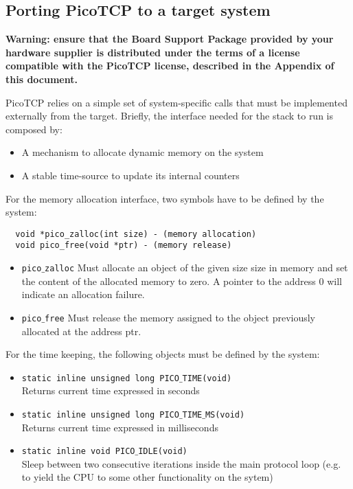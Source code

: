 \subsection{Porting PicoTCP to a target system}

\begin{center}
\textbf{Warning: ensure that the Board Support Package provided by your
hardware supplier is distributed under the terms of a license compatible
with the PicoTCP license, described in the Appendix of this document.}
\end{center}

PicoTCP relies on a simple set of system-specific calls that must be
implemented externally from the target. Briefly, the interface needed for
the stack to run is composed by:
\begin{itemize}
\item A mechanism to allocate dynamic memory on the system
\item A stable time-source to update its internal counters
\end{itemize} 

For the memory allocation interface, two symbols have to be defined by the system:
\begin{verbatim}
  void *pico_zalloc(int size) - (memory allocation) 
  void pico_free(void *ptr) - (memory release)
\end{verbatim}

\begin{itemize}
\item \texttt{pico$\_$zalloc} Must allocate an object of the given size size in memory
and set the content of the allocated memory to zero. A pointer to the address 0 will
indicate an allocation failure.
\item \texttt{pico$\_$free} Must release the memory assigned to the object previously
allocated at the address ptr.
\end{itemize}


For the time keeping, the following objects must be defined by the system:
\begin{itemize}%
\item
\texttt{static inline unsigned long PICO$\_$TIME(void)}\\
Returns current time expressed in seconds

\item
\texttt{static inline unsigned long PICO$\_$TIME$\_$MS(void)}\\
Returns current time expressed in milliseconds

\item
\texttt{static inline void PICO$\_$IDLE(void)}\\
Sleep between two consecutive iterations inside the main protocol loop
(e.g. to yield the CPU to some other functionality on the sytem)
\end{itemize}

